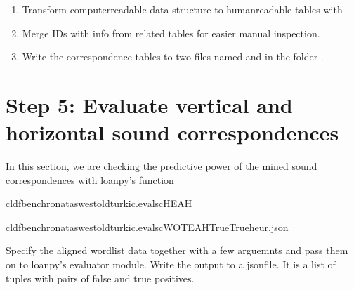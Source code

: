 \documentclass[letterpaper,10pt,english]{sphinxmanual}
\begin{document}
{{{{\begin{fulllineitems}
\begin{enumerate}
\item {} 
\sphinxAtStartPar
Transform computer\sphinxhyphen{}readable data structure to human\sphinxhyphen{}readable tables
with 

\item {} 
\sphinxAtStartPar
Merge IDs with info from related tables for easier manual inspection.

\item {} 
\sphinxAtStartPar
Write the correspondence tables to two files named
 and 
in the folder .

\end{enumerate}

\end{fulllineitems}



\section{Step 5: Evaluate vertical and horizontal sound correspondences}
\label{\detokenize{mkloanpy:step-5-evaluate-vertical-and-horizontal-sound-correspondences}}
\sphinxAtStartPar
In this section, we are checking the predictive power of the mined
sound correspondences with loanpy’s 
function

\begin{sphinxVerbatim}[commandchars=\\\{\}]
cldfbenchronataswestoldturkic.evalscHEAH
\end{sphinxVerbatim}

\begin{sphinxVerbatim}[commandchars=\\\{\}]
cldfbenchronataswestoldturkic.evalscWOTEAHTrueTrueheur.json
\end{sphinxVerbatim}
\label{\detokenize{mkloanpy:module-ronataswestoldturkiccommands.evalsc}}
\sphinxAtStartPar
Specify the aligned wordlist data together with a few arguemnts
and pass them on to loanpy’s evaluator module. Write the output
to a json\sphinxhyphen{}file. It is a list of tuples with pairs of
false and true positives.

}}}}
\end{document}
